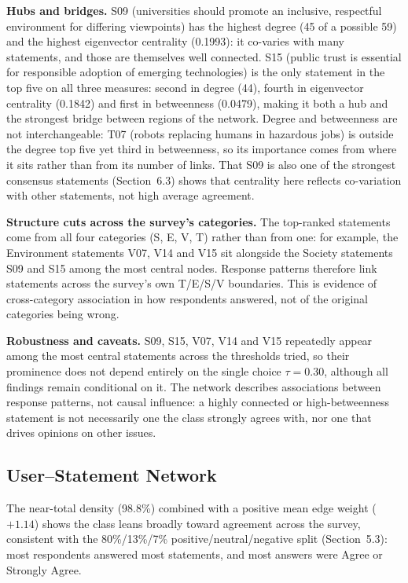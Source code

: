 \documentclass[11pt]{article}
\begin{document}
\textbf{Hubs and bridges.} S09 (universities should promote an inclusive, respectful
environment for differing viewpoints) has the highest degree (45 of a possible 59) and the
highest eigenvector centrality (0.1993): it co-varies with many statements, and those are
themselves well connected. S15 (public trust is essential for responsible adoption of
emerging technologies) is the only statement in the top five on all three measures: second in
degree (44), fourth in eigenvector centrality (0.1842) and first in betweenness (0.0479),
making it both a hub and the strongest bridge between regions of the network. Degree and
betweenness are not interchangeable: T07 (robots replacing humans in hazardous jobs) is
outside the degree top five yet third in betweenness, so its importance comes from where it
sits rather than from its number of links. That S09 is also one of the strongest consensus
statements (Section~6.3) shows that centrality here reflects co-variation with other
statements, not high average agreement.

\textbf{Structure cuts across the survey's categories.} The top-ranked statements come from
all four categories (S, E, V, T) rather than from one: for example, the Environment
statements V07, V14 and V15 sit alongside the Society statements S09 and S15 among the most
central nodes. Response patterns therefore link statements across the survey's own T/E/S/V
boundaries. This is evidence of cross-category association in how respondents answered, not
of the original categories being wrong.

\textbf{Robustness and caveats.} S09, S15, V07, V14 and V15 repeatedly appear among the most
central statements across the thresholds tried, so their prominence does not depend entirely
on the single choice $\tau = 0.30$, although all findings remain conditional on it. The network describes
associations between response patterns, not causal influence: a highly connected or
high-betweenness statement is not necessarily one the class strongly agrees with, nor one that
drives opinions on other issues.

\subsection{User--Statement Network}
The near-total density (98.8\%) combined with a positive mean edge weight ($+1.14$) shows the class
leans broadly toward agreement across the survey, consistent with the 80\%/13\%/7\%
positive/neutral/negative split (Section~5.3): most respondents answered most statements, and most
answers were Agree or Strongly Agree.
\end{document}
